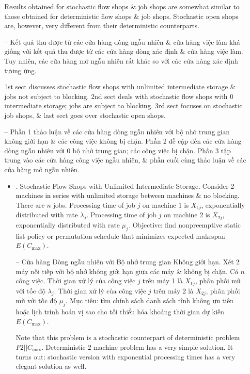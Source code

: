 \documentclass{article}
\begin{document}
\begin{itemize}
    Results obtained for stochastic flow shops \& job shops are somewhat similar to those obtained for deterministic flow shops \& job shops. Stochastic open shops are, however, very different from their deterministic counterparts.

    -- Kết quả thu được từ các cửa hàng dòng ngẫu nhiên \& cửa hàng việc làm khá giống với kết quả thu được từ các cửa hàng dòng xác định \& cửa hàng việc làm. Tuy nhiên, các cửa hàng mở ngẫu nhiên rất khác so với các cửa hàng xác định tương ứng.

    1st sect discusses stochastic flow shops with unlimited intermediate storage \& jobs not subject to blocking. 2nd sect deals with stochastic flow shops with 0 intermediate storage; jobs are subject to blocking. 3rd sect focuses on stochastic job shops, \& last sect goes over stochastic open shops.

    -- Phần 1 thảo luận về các cửa hàng dòng ngẫu nhiên với bộ nhớ trung gian không giới hạn \& các công việc không bị chặn. Phần 2 đề cập đến các cửa hàng dòng ngẫu nhiên với 0 bộ nhớ trung gian; các công việc bị chặn. Phần 3 tập trung vào các cửa hàng công việc ngẫu nhiên, \& phần cuối cùng thảo luận về các cửa hàng mở ngẫu nhiên.
    \begin{itemize}
        \item {. Stochastic Flow Shops with Unlimited Intermediate Storage.} Consider 2 machines in series with unlimited storage between machines \& no blocking. There are $n$ jobs. Processing time of job $j$ on machine 1 is $X_{1j}$, exponentially distributed with rate $\lambda_j$. Processing time of job $j$ on machine 2 is $X_{2j}$, exponentially distributed with rate $\mu_j$. Objective: find nonpreemptive static list policy or permutation schedule that minimizes expected makespan $E(C_{\max})$.

        -- {\sf Cửa hàng Dòng ngẫu nhiên với Bộ nhớ trung gian Không giới hạn.} Xét 2 máy nối tiếp với bộ nhớ không giới hạn giữa các máy \& không bị chặn. Có $n$ công việc. Thời gian xử lý của công việc $j$ trên máy 1 là $X_{1j}$, phân phối mũ với tốc độ $\lambda_j$. Thời gian xử lý của công việc $j$ trên máy 2 là $X_{2j}$, phân phối mũ với tốc độ $\mu_j$. Mục tiêu: tìm chính sách danh sách tĩnh không ưu tiên hoặc lịch trình hoán vị sao cho tối thiểu hóa khoảng thời gian dự kiến $E(C_{\max})$.

        Note that this problem is a stochastic counterpart of deterministic problem $F2||C_{\max}$. Deterministic 2 machine problem has a very simple solution. It turns out: stochastic version with exponential processing times has a very elegant solution as well.


\end{itemize}
\end{itemize}
\end{document}
